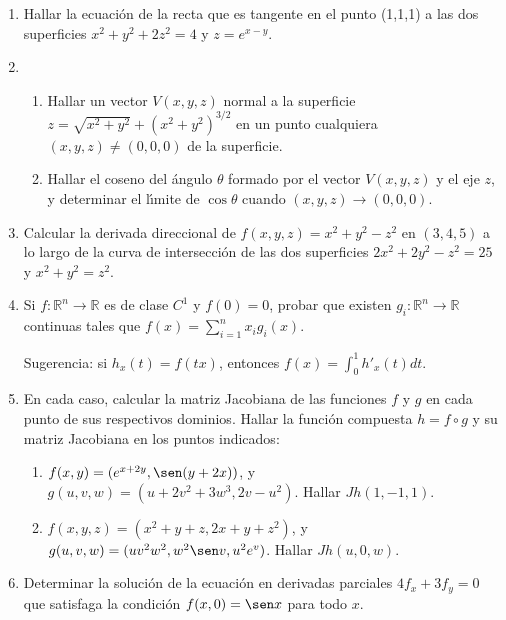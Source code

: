 \documentclass[11pt]{article}
\newcommand{\R}{\mathbb{R}}
\begin{document}
\begin{enumerate}
\item Hallar la ecuaci\'on de la recta que es tangente en el punto
  (1,1,1) a las dos superficies $x^2+y^2+2z^2=4$ y $z=e^{x-y}$. 

\item

\begin{enumerate}\item Hallar un vector $V(x,y,z)$ normal a la superficie 
  $z=\sqrt{x^2+y^2}+(x^2+y^2)^{3/2}$ en un punto cualquiera
  $(x,y,z)\neq (0,0,0)$ de la superficie. 
     \item Hallar el coseno del \'angulo $\theta$ formado por el
       vector $V(x,y,z)$ y el eje $z$, y determinar el l\'\i mite de
       $\cos\theta$ cuando $(x,y,z)\to (0,0,0)$. \end{enumerate}

\item Calcular la derivada direccional de $f(x,y,z)=x^2+y^2-z^2$ en
  $(3,4,5)$ a lo largo de la curva de intersecci\'on de las dos
  superficies $2x^2+2y^2-z^2=25$ y $x^2+y^2=z^2$. 

\item Si $f:\R^n\to\R$ es de clase $C^1$ y $f(0)=0$, probar que existen
  $g_i:\R^n\to\R$ continuas tales que $f(x)=\sum_{i=1}^nx_ig_i(x)$. 
  
 Sugerencia: si $h_x(t)=f(tx)$, entonces $f(x)=\int_0^1h'_x(t)dt$.
 
\item En cada caso, calcular la matriz Jacobiana de las funciones $f$ y $g$ en cada punto de sus respectivos dominios. Hallar la funci\'on compuesta $h=f\circ g$ y su matriz Jacobiana en los puntos indicados:

\begin{enumerate}
\item $f(x,y)=(e^{x+2y},\sen(y+2x))$, y
  $g(u,v,w)=(u+2v^2+3w^3, 2v-u^2)$. Hallar $Jh(1,-1,1)$.
  
  \item $f(x,y,z)=(x^2+y+z,2x+y+z^2)$, y 
  $g(u,v,w)=(uv^2w^2,w^2\sen v,u^2e^v)$. Hallar $Jh(u,0,w)$.
    
\end{enumerate}

\item Determinar la soluci\'on de la ecuaci\'on en derivadas parciales
  $4f_x+3f_y=0$ que satisfaga la condici\'on $f(x,0)=\sen x$ para todo
  $x$.   
\end{enumerate}
\end{document}
